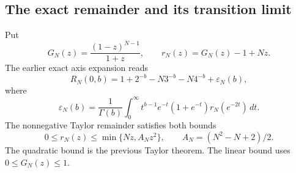 \subsection{The exact remainder and its transition limit}
Put
\[
 G_N(z)=\frac{(1-z)^{N-1}}{1+z},\qquad
 r_N(z)=G_N(z)-1+Nz.
\]
The earlier exact axis expansion reads
\begin{equation}\label{eul:eq:axis-second-start}
 R_N(0,b)=1+2^{-b}-N3^{-b}-N4^{-b}+\varepsilon_N(b),
\end{equation}
where
\begin{equation}\label{eul:eq:epsilon-integral}
 \varepsilon_N(b)=\frac1{\Gamma(b)}\int_0^\infty
 t^{b-1}e^{-t}(1+e^{-t})r_N(e^{-2t})\,dt.
\end{equation}
The nonnegative Taylor remainder satisfies both bounds
\begin{equation}\label{eul:eq:two-remainder-bounds}
 0\leq r_N(z)\leq\min\{Nz,A_Nz^2\},\qquad
 A_N=(N^2-N+2)/2.
\end{equation}
The quadratic bound is the previous Taylor theorem.  The linear bound
uses $0\leq G_N(z)\leq1$.

